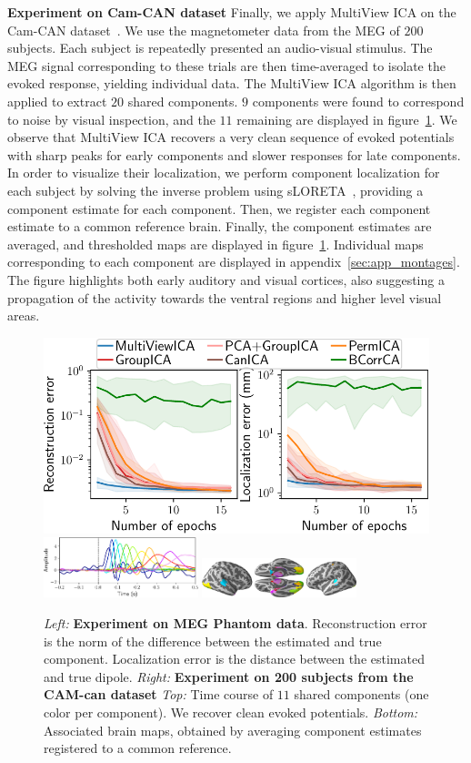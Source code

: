 \textbf{Experiment on Cam-CAN dataset}
Finally, we apply MultiView ICA on the Cam-CAN dataset~\cite{taylor2017cambridge}. We use the magnetometer data from the MEG of $200$ subjects.
%
Each subject is repeatedly presented an audio-visual stimulus. 
%
The MEG signal corresponding to these trials are then time-averaged to isolate the evoked response, yielding individual data.
%
The MultiView ICA algorithm is then applied to extract $20$ shared components.
%
$9$ components were found to correspond to noise by visual inspection, and the $11$ remaining are displayed in figure~\ref{fig:meg}.
%
We observe that MultiView ICA recovers a very clean sequence of evoked potentials with sharp peaks
for early components and slower responses for late components.
%
In order to visualize their localization, we perform component localization for each subject by solving the inverse problem using sLORETA~\cite{pascual2002standardized}, providing a component estimate for each component.
%
Then, we register each component estimate to a common reference brain.
%
Finally, the component estimates are averaged, and thresholded maps are displayed in figure~\ref{fig:meg}.
%
Individual maps corresponding to each component are displayed in appendix~\ref{sec:app_montages}.
The figure highlights both early auditory and visual cortices, also suggesting a propagation
of the activity towards the ventral regions and higher level visual areas.

\begin{figure}
    \centering

          \includegraphics[width=0.4\linewidth]{figures/mvica/phantom_new.pdf}
          \includegraphics[width=0.4\textwidth]{figures/mvica/camcan_sources.pdf}
          \includegraphics[width=0.4\textwidth]{figures/mvica/montage_all.png}
    \caption{\emph{Left:} \textbf{Experiment on MEG Phantom data}. Reconstruction error is the norm of the difference between the estimated and true component. Localization error is the distance between the estimated and true dipole. \emph{Right:} \textbf{Experiment on 200 subjects from the CAM-can dataset} \emph{Top:} Time course of $11$ shared components (one color per component). We recover clean evoked potentials. \emph{Bottom:} Associated brain maps, obtained by averaging component estimates registered to a common reference.}
    \label{fig:meg}
\end{figure}

